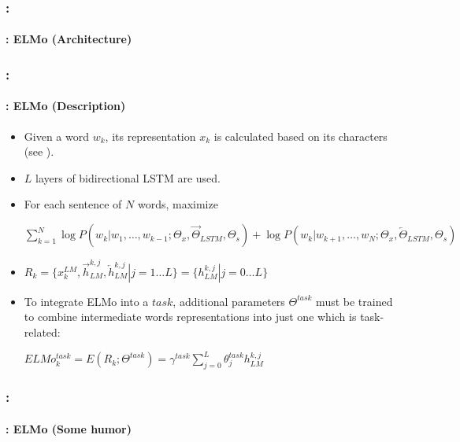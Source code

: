 \documentclass[xcolor=table]{beamer}
\begin{document}
\begin{frame}
	\frametitle{\insertshortsubtitle: \insertsection}
	\framesubtitle{\insertsubsection: ELMo (Architecture)}
	
	\begin{center}
	\end{center}
	
\end{frame}

\begin{frame}
	\frametitle{\insertshortsubtitle: \insertsection}
	\framesubtitle{\insertsubsection: ELMo (Description)}

	\begin{itemize}
		\item Given a word $w_k$, its representation $x_k$ is calculated based on its characters (see \cite{2015-kim-al}).
		\item $L$ layers of bidirectional LSTM are used. 
		\item For each sentence of $N$ words, maximize\\ 
		\begin{center}
			$\sum_{k=1}^{N} 
		\log P(w_k | w_1,\ldots,w_{k-1}; \Theta_x, \overrightarrow{\Theta}_{LSTM}, \Theta_s)
		+
		\log P(w_k | w_{k+1},\ldots,w_{N}; \Theta_x, \overleftarrow{\Theta}_{LSTM}, \Theta_s)
		$
		\end{center}
		
		\item $R_k = \{x_k^{LM}, \overrightarrow{h}_{LM}^{k, j}, \overleftarrow{h}_{LM}^{k, j} | j= 1 \ldots L \}
		= \{h_{LM}^{k, j} | j= 0 \ldots L \}
		$
		
		\item To integrate ELMo into a $task$, additional parameters $\Theta^{task}$ must be trained to combine intermediate words representations into just one which is task-related:\\
		\begin{center}
			$ELMo_k^{task} = E(R_k; \Theta^{task}) = \gamma^{task} \sum_{j=0}^{L} \theta_j^{task} h_{LM}^{k, j}$
		\end{center}
	\end{itemize}

\end{frame}

\begin{frame}
	\frametitle{\insertshortsubtitle: \insertsection}
	\framesubtitle{\insertsubsection: ELMo (Some humor)}

	\begin{center}
	\end{center}
	
\end{frame}
\end{document}
